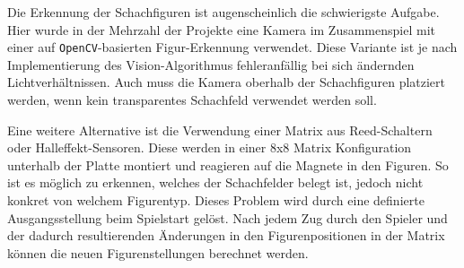 Die Erkennung der Schachfiguren ist augenscheinlich die schwierigste
Aufgabe. Hier wurde in der Mehrzahl der Projekte eine Kamera im
Zusammenspiel mit einer auf \passthrough{\lstinline!OpenCV!}-basierten
Figur-Erkennung verwendet. Diese Variante ist je nach Implementierung
des Vision-Algorithmus fehleranfällig bei sich ändernden
Lichtverhältnissen. Auch muss die Kamera oberhalb der Schachfiguren
platziert werden, wenn kein transparentes Schachfeld verwendet werden
soll.

Eine weitere Alternative ist die Verwendung einer Matrix aus
Reed-Schaltern oder Halleffekt-Sensoren. Diese werden in einer 8x8
Matrix Konfiguration unterhalb der Platte montiert und reagieren auf die
Magnete in den Figuren. So ist es möglich zu erkennen, welches der
Schachfelder belegt ist, jedoch nicht konkret von welchem Figurentyp.
Dieses Problem wird durch eine definierte Ausgangsstellung beim
Spielstart gelöst. Nach jedem Zug durch den Spieler und der dadurch
resultierenden Änderungen in den Figurenpositionen in der Matrix können
die neuen Figurenstellungen berechnet werden.

\pagebreak

